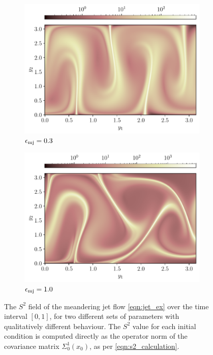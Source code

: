 \begin{figure}
	\begin{center}
		\begin{subfigure}{0.49\textwidth}
			\includegraphics[width=\textwidth]{chp04_paper_numerics/figures/rossby/S2_zero_0.3.pdf}
			\caption{\(\epsilon_{\mathrm{mj}} = 0.3\)}
			\label{fig:s2_field_0.3}
		\end{subfigure}
		\begin{subfigure}{0.49\textwidth}
			\includegraphics[width=\textwidth]{chp04_paper_numerics/figures/rossby/s2_zero_1.0.pdf}
			\caption{\(\epsilon_{\mathrm{mj}} = 1.0\)}
			\label{fig:s2_field_1.0}
		\end{subfigure}
		\caption{The \(S^2\) field of the meandering jet flow \cref{eqn:jet_ex} over the time interval \([0,1]\), for two different sets of parameters with qualitatively different behaviour.
			The \(S^2\) value for each initial condition is computed directly as the operator norm of the covariance matrix \(\Sigma_0^1\!\left(x_0\right)\), as per \cref{eqn:s2_calculation}.}
		\label{fig:ex_jet_s2_field}
	\end{center}
\end{figure}



